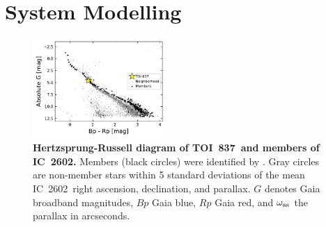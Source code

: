 \documentclass[12pt,twocolumn,tighten]{aastex62}
\newcommand{\tn}{TOI~837} %
\newcommand{\cn}{IC~2602} %
\begin{document}
\section{System Modelling}
\label{sec:system}

\begin{figure}[t!]
	\begin{center}
		\leavevmode
		\includegraphics[width=0.45\textwidth]{f7.pdf}
	\end{center}
	\vspace{-0.7cm}
	\caption{ 
  {\bf Hertzsprung-Russell diagram of \tn\ and members of \cn.}
  Members (black circles) were identified by
  \citet{cantatgaudin_gaia_2018}.  Gray circles are non-member stars
  within 5 standard deviations of the mean \cn\ right ascension,
  declination, and parallax.  $G$ denotes Gaia broadband magnitudes,
  $Bp$ Gaia blue, $Rp$ Gaia red, and $\omega_{\rm as}$ the parallax in
  arcseconds. 
  \label{fig:hr}
	}
\end{figure}
\end{document}

